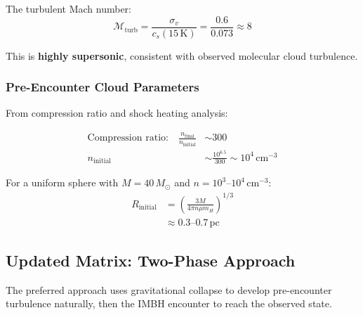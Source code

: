 \documentclass[11pt,a4paper]{article}
\newcommand{\Msun}{M_\odot}
\newcommand{\pc}{\,\mathrm{pc}}
\newcommand{\cmcubed}{\,\mathrm{cm^{-3}}}
\begin{document}
The turbulent Mach number:
\begin{equation}
    \mathcal{M}_\mathrm{turb} = \frac{\sigma_v}{c_s(15\,\mathrm{K})} = \frac{0.6}{0.073} \approx 8
\end{equation}

This is \textbf{highly supersonic}, consistent with observed molecular cloud turbulence.

\subsubsection{Pre-Encounter Cloud Parameters}

From compression ratio and shock heating analysis:

\begin{align}
    \text{Compression ratio:} \quad \frac{n_\mathrm{final}}{n_\mathrm{initial}} &\sim 300 \\
    n_\mathrm{initial} &\sim \frac{10^{6.5}}{300} \sim 10^4\cmcubed
\end{align}

For a uniform sphere with $M = 40\,\Msun$ and $n = 10^3$--$10^4\cmcubed$:
\begin{align}
    R_\mathrm{initial} &= \left(\frac{3M}{4\pi n \mu m_H}\right)^{1/3} \\
    &\approx 0.3\text{--}0.7\pc
\end{align}

\subsection{Updated Matrix: Two-Phase Approach}

The preferred approach uses gravitational collapse to develop pre-encounter
turbulence naturally, then the IMBH encounter to reach the observed state.
\end{document}
